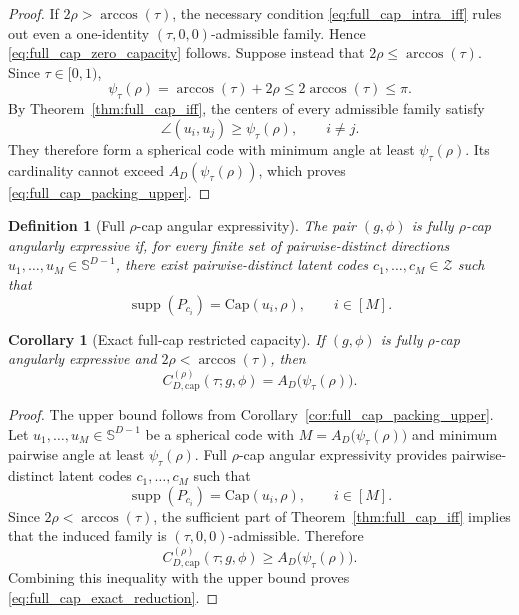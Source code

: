 \documentclass[journal]{IEEEtran}
\newtheorem{definition}[theorem]{Definition}
\newtheorem{corollary}[theorem]{Corollary}
\begin{document}
\begin{bibunit}
\begin{proof}
%
If $2\rho>\arccos(\tau)$, the necessary condition \eqref{eq:full_cap_intra_iff} rules out even a one-identity
$(\tau,0,0)$-admissible family. Hence \eqref{eq:full_cap_zero_capacity} follows. Suppose instead that $2\rho\le\arccos(\tau)$. Since $\tau\in[0,1)$,
\[
\psi_\tau(\rho) = \arccos(\tau)+2\rho \le 2\arccos(\tau) \le \pi.
\]
By Theorem~\ref{thm:full_cap_iff}, the centers of every admissible family satisfy
\[
\angle(u_i,u_j) \ge \psi_\tau(\rho), \qquad i\ne j.
\]
They therefore form a spherical code with minimum angle at least $\psi_\tau(\rho)$. Its cardinality cannot exceed $A_D(\psi_\tau(\rho))$, which proves \eqref{eq:full_cap_packing_upper}.
%
\end{proof}


\begin{definition}[Full $\rho$-cap angular expressivity]
\label{def:full_cap_angular_expressivity}
%
The pair $(g,\phi)$ is \textit{fully $\rho$-cap angularly expressive} if, for every finite set of pairwise-distinct directions $u_1,\ldots,u_M\in\mathbb S^{D-1}$, there exist pairwise-distinct latent codes $c_1,\ldots,c_M\in\mathcal Z$ such that
%
\begin{equation}
\operatorname{supp}(P_{c_i}) = \mathrm{Cap}(u_i,\rho), \qquad i\in[M].
\end{equation}
%
\end{definition}

\vspace{5pt}

\begin{corollary}[Exact full-cap restricted capacity]
\label{cor:full_cap_exact_reduction}
%
If $(g,\phi)$ is fully $\rho$-cap angularly expressive and $2\rho<\arccos(\tau)$, then
%
\begin{equation}
C_{D,\mathrm{cap}}^{(\rho)}(\tau;g,\phi) = A_D\bigl(\psi_\tau(\rho)\bigr).
\label{eq:full_cap_exact_reduction}
\end{equation}
%
\end{corollary}

\begin{proof}
%
The upper bound follows from Corollary~\ref{cor:full_cap_packing_upper}. Let $u_1,\ldots,u_M\in\mathbb S^{D-1}$ be a spherical code with $M=A_D\bigl(\psi_\tau(\rho)\bigr)$ and minimum pairwise angle at least $\psi_\tau(\rho)$. Full $\rho$-cap angular expressivity provides pairwise-distinct latent codes $c_1,\ldots,c_M$ such that
\[
\operatorname{supp}(P_{c_i}) = \mathrm{Cap}(u_i,\rho), \qquad i\in[M].
\]
Since $2\rho<\arccos(\tau)$, the sufficient part of Theorem~\ref{thm:full_cap_iff} implies that the induced family is $(\tau,0,0)$-admissible. Therefore
\[
C_{D,\mathrm{cap}}^{(\rho)}(\tau;g,\phi) \ge A_D\bigl(\psi_\tau(\rho)\bigr).
\]
Combining this inequality with the upper bound proves \eqref{eq:full_cap_exact_reduction}.
%
\end{proof}

 


\renewcommand{\refname}{Appendix References}
\putbib
\end{bibunit}
\end{document}
